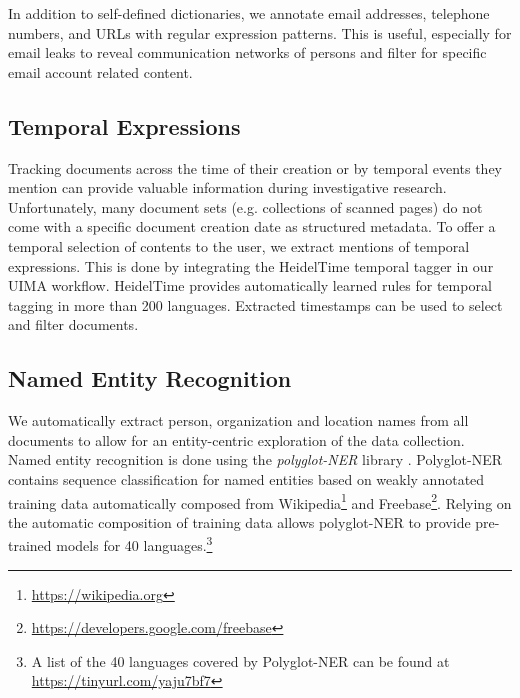 \documentclass[11pt,a4paper]{article}
\begin{document}
In addition to self-defined dictionaries, we annotate email addresses, telephone numbers, and URLs with regular expression patterns. This is useful, especially for email leaks to reveal communication networks of persons and filter for specific email account related content.


\subsection{Temporal Expressions}%

Tracking documents across the time of their creation or by temporal events they mention can provide valuable information during investigative research.
Unfortunately, many document sets (e.g. collections of scanned pages) do not come with a specific document creation date as structured metadata. To offer a temporal selection of contents to the user, we extract mentions of temporal expressions. This is done by integrating the HeidelTime temporal tagger \cite{Strotgen.2015} in our UIMA workflow. HeidelTime provides automatically learned rules for temporal tagging in more than 200 languages. Extracted timestamps can be used to select and filter documents.


\subsection{Named Entity Recognition}

We automatically extract person, organization and location names from all documents to allow for an entity-centric exploration of the data collection. Named entity recognition is done using the \emph{polyglot-NER} library \cite{AlRfou.2015}. Polyglot-NER contains sequence classification for named entities based on weakly annotated training data automatically composed from Wikipedia\footnote{\url{https://wikipedia.org}} and Freebase\footnote{\url{https://developers.google.com/freebase}}. Relying on the automatic composition of training data allows polyglot-NER to provide pre-trained models for 40 languages.\footnote{A list of the 40 languages covered by Polyglot-NER can be found at \url{https://tinyurl.com/yaju7bf7}}

\end{document}

